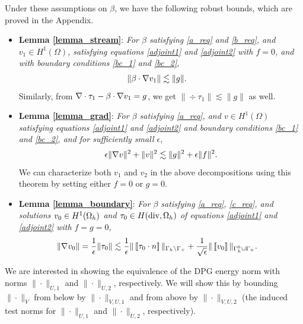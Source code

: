 Under these assumptions on $\beta$, we have the following robust bounds, which are proved in the Appendix. 
\begin{itemize}
\item \textbf{Lemma \ref{lemma_stream}}: \textit{For $\beta$ satisfying \eqref{a_req} and \eqref{b_req}, %
and $v_1 \in H^1(\Omega)$, satisfying equations \eqref{adjoint1} and \eqref{adjoint2} with $f=0$, and with boundary conditions \eqref{bc_1} and \eqref{bc_2}},
\begin{align*}
\|\beta \cdot \grad v_1 \| &\lesssim \| g\|.
\end{align*}
Similarly, from $\div \tau_1 - \beta\cdot \grad v_1 = g$, we get $\|\div \tau_1\| \lesssim \|g\|$ as well.  
\item \textbf{Lemma \ref{lemma_grad}}: \textit{For $\beta$ satisfying \eqref{a_req}, and $v \in H^1(\Omega)$ satisfying equations \eqref{adjoint1} and \eqref{adjoint2} and boundary conditions \eqref{bc_1} and \eqref{bc_2}, and for sufficiently small $\epsilon$},
\[
\epsilon \|\grad v\|^2 + \|v\|^2 \lesssim \|g\|^2 + \epsilon \|f\|^2.
\]
We can characterize both $v_1$ and $v_2$ in the above decompositions using this theorem by setting either $f=0$ or $g=0$. 
\item \textbf{Lemma \ref{lemma_boundary}}: \textit{For $\beta$ satisfying \eqref{a_req}, \eqref{c_req}, and solutions $v_0 \in H^1(\Oh)$ and $\tau_0 \in H({\rm div},\Oh)$ of equations \eqref{adjoint1} and \eqref{adjoint2} with $f=g=0$,} 
\begin{align*}
\|\grad v_0\| = \frac{1}{\epsilon}\|\tau_0\| &\lesssim \frac{1}{\epsilon} \| \jump{\tau_0\cdot n}\|_{\Gh \setminus \Gamma_+} + \frac{1}{\sqrt{\epsilon}} \| \jump{v_0}\|_{\Gh^0 \cup \Gamma_+}.
\end{align*}
\end{itemize}
We are interested in showing the equivalence of the DPG energy norm with norms $\|\cdot\|_{U,1}$ and $\|\cdot\|_{U,2}$, respectively.  We will show this by bounding $\|\cdot \|_V$ from below by $\|\cdot\|_{V,U,1}$ and from above by $\|\cdot\|_{V,U,2}$ (the induced test norms for $\|\cdot\|_{U,1}$ and $\|\cdot\|_{U,2}$, respectively).  

